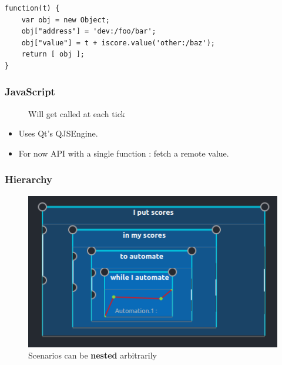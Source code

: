 \documentclass{beamer}
\begin{document}
    \begin{lrbox}{\codebox}
    	\begin{lstlisting}
function(t) { 
    var obj = new Object; 
    obj["address"] = 'dev:/foo/bar'; 
    obj["value"] = t + iscore.value('other:/baz'); 
    return [ obj ]; 
}
    	\end{lstlisting}
    \end{lrbox}
    
    \begin{frame}
    	\frametitle{JavaScript}
    	\begin{figure}
    		\centering
    	    \usebox{\codebox}
    	    \caption{Will get called at each tick}
    	\end{figure}
    	
    	\begin{itemize}
    		\item Uses Qt's QJSEngine.
    		\item For now API with a single function : fetch a remote value.
    	\end{itemize}
    \end{frame}
    
    \begin{frame}
        \frametitle{Hierarchy}
        
        \begin{figure}
        	\centering
        	\includegraphics[scale=0.6]{images/hierarchy.png}
        	\caption{Scenarios can be \textbf{nested} arbitrarily}
        \end{figure}   
    \end{frame}
    
\end{document}
